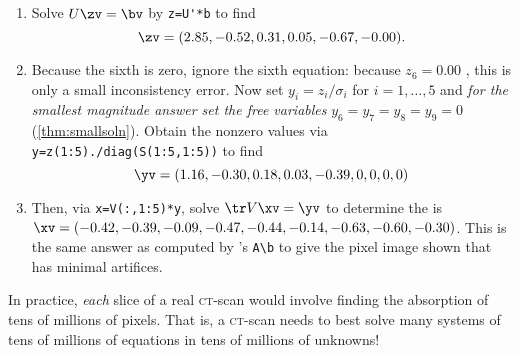 \begin{example}
\begin{enumerate}
\item Solve \(U\zv=\bv\) by \verb|z=U'*b| to find
\begin{equation*}
\zv=(2.85,-0.52, 0.31, 0.05,-0.67,-0.00).
\end{equation*}

\item Because the sixth  is zero, ignore the sixth equation: because \(z_6=0.00\) \twodp, this is only a small inconsistency error.
Now set $y_i=z_i/\sigma_i$ for \(i=1,\ldots,5\) and \emph{for the smallest magnitude answer set the free variables} \(y_6=y_7=y_8=y_9=0\) (\cref{thm:smallsoln}).
Obtain the nonzero values via \verb|y=z(1:5)./diag(S(1:5,1:5))| to find
\begin{equation*}
\yv=(1.16,-0.30, 0.18, 0.03,-0.39,0,0,0,0)
\end{equation*}

\item 
\begin{figbox}{}%
Then,  via \verb|x=V(:,1:5)*y|, solve \(\tr V\xv=\yv\) to determine the  is
\(\sloppy\xv= (-0.42,-0.39,-0.09,-0.47,-0.44,-0.14,-0.63,-0.60,-0.30)\).
This is the same answer as computed by \script[2]'s \verb|A\b| to give the pixel image shown that has minimal artifices.
\reParshape
\end{figbox}

\end{enumerate}

In practice, \emph{each} slice of a real \textsc{ct}-scan would involve finding the absorption of tens of millions of pixels.
That is, a \textsc{ct}-scan needs to best solve many systems of tens of millions of equations in tens of millions of unknowns!
\end{example}



